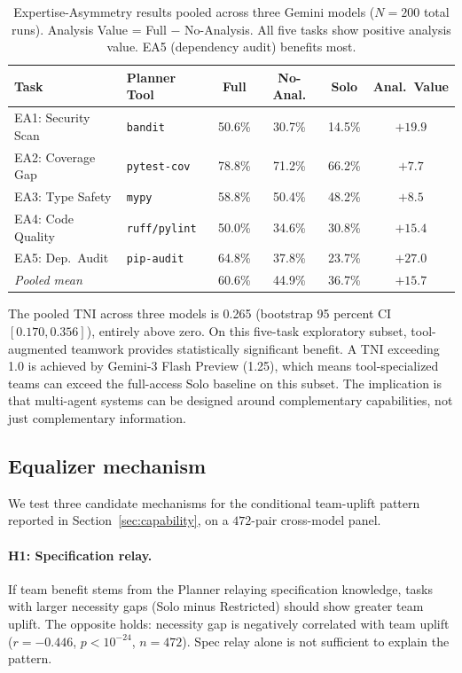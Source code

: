 \documentclass{article}
\begin{document}
\begin{table}[h]
\centering
\caption{Expertise-Asymmetry results pooled across three Gemini models ($N=200$ total runs). Analysis Value = Full $-$ No-Analysis. All five tasks show positive analysis value. EA5 (dependency audit) benefits most.}
\label{tab:ea-detail}
\small
\begin{tabular}{llcccc}
\toprule
Task & Planner Tool & Full & No-Anal. & Solo & Anal.\ Value \\
\midrule
EA1: Security Scan & \texttt{bandit}      & 50.6\% & 30.7\% & 14.5\% & $+19.9$ \\
EA2: Coverage Gap  & \texttt{pytest-cov}  & 78.8\% & 71.2\% & 66.2\% & $+7.7$  \\
EA3: Type Safety   & \texttt{mypy}        & 58.8\% & 50.4\% & 48.2\% & $+8.5$  \\
EA4: Code Quality  & \texttt{ruff/pylint} & 50.0\% & 34.6\% & 30.8\% & $+15.4$ \\
EA5: Dep.\ Audit   & \texttt{pip-audit}   & 64.8\% & 37.8\% & 23.7\% & $+27.0$ \\
\midrule
\textit{Pooled mean} & & 60.6\% & 44.9\% & 36.7\% & $+15.7$ \\
\bottomrule
\end{tabular}
\end{table}

The pooled TNI across three models is 0.265 (bootstrap 95 percent CI $[0.170, 0.356]$), entirely above zero. On this five-task exploratory subset, tool-augmented teamwork provides statistically significant benefit. A TNI exceeding 1.0 is achieved by Gemini-3 Flash Preview (1.25), which means tool-specialized teams can exceed the full-access Solo baseline on this subset. The implication is that multi-agent systems can be designed around complementary capabilities, not just complementary information.

\subsection{Equalizer mechanism}
\label{app:equalizer-mechanism}

We test three candidate mechanisms for the conditional team-uplift pattern reported in Section~\ref{sec:capability}, on a $472$-pair cross-model panel.

\paragraph{H1: Specification relay.}
If team benefit stems from the Planner relaying specification knowledge, tasks with larger necessity gaps (Solo minus Restricted) should show greater team uplift. The opposite holds: necessity gap is negatively correlated with team uplift ($r = -0.446$, $p < 10^{-24}$, $n = 472$). Spec relay alone is not sufficient to explain the pattern.
\end{document}
